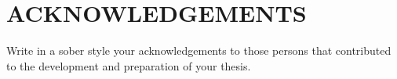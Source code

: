 \documentclass[12pt,reqno,oneside]{pucthesis}         %
\begin{document}



\chapter*{ACKNOWLEDGEMENTS}
Write in a sober style your acknowledgements to those persons that contributed to the development and preparation of your thesis.

       
\cleardoublepage %



\tableofcontents
\listoffigures          
\listoftables           
\cleardoublepage %


\end{document}
